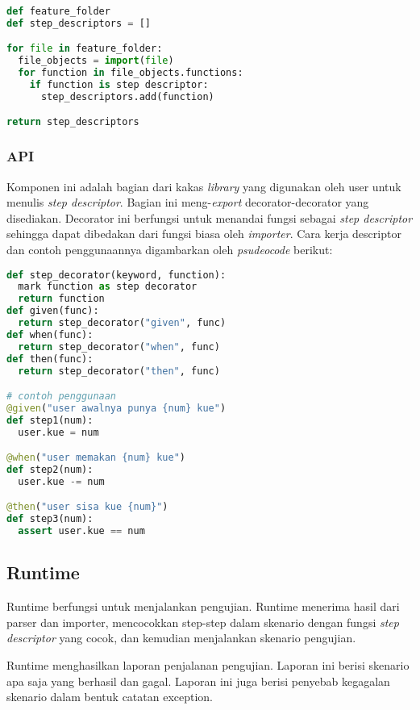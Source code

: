 \begin{lstlisting}[language=python]
def feature_folder
def step_descriptors = []

for file in feature_folder:
  file_objects = import(file)
  for function in file_objects.functions:
    if function is step descriptor:
      step_descriptors.add(function)

return step_descriptors
\end{lstlisting}

\subsubsection{API}

Komponen ini adalah bagian dari kakas \emph{library} yang digunakan oleh user untuk menulis
\emph{step descriptor}. Bagian ini meng-\emph{export} decorator-decorator yang disediakan.
Decorator ini berfungsi untuk menandai fungsi sebagai \emph{step descriptor} sehingga dapat
dibedakan dari fungsi biasa oleh \emph{importer}. Cara kerja descriptor dan contoh penggunaannya
digambarkan oleh \emph{psudeocode} berikut:

\begin{lstlisting}[language=python]
def step_decorator(keyword, function):
  mark function as step decorator
  return function
def given(func):
  return step_decorator("given", func)
def when(func):
  return step_decorator("when", func)
def then(func):
  return step_decorator("then", func)

# contoh penggunaan
@given("user awalnya punya {num} kue")
def step1(num):
  user.kue = num

@when("user memakan {num} kue")
def step2(num):
  user.kue -= num

@then("user sisa kue {num}")
def step3(num):
  assert user.kue == num
\end{lstlisting}


\subsection{Runtime}

Runtime berfungsi untuk menjalankan pengujian. Runtime menerima hasil dari parser dan importer,
mencocokkan step-step dalam skenario dengan fungsi \emph{step descriptor} yang cocok,
dan kemudian menjalankan skenario pengujian.

Runtime menghasilkan laporan penjalanan pengujian. Laporan ini berisi skenario apa saja
yang berhasil dan gagal. Laporan ini juga berisi penyebab kegagalan skenario dalam
bentuk catatan exception.

